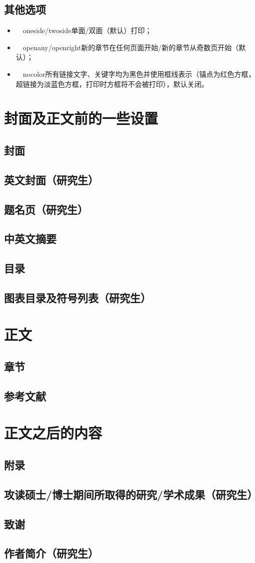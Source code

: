 		\subsection{其他选项}
		\begin{itemize}
			\item ~~oneside\slash twoside\quad 单面\slash 双面（默认）打印；\\
			\item ~~openany\slash openright\quad 新的章节在任何页面开始\slash 新的章节从奇数页开始（默认）；\\
			\item ~~nocolor\quad 所有链接文字、关键字均为黑色并使用框线表示（锚点为红色方框，超链接为淡蓝色方框，打印时方框将不会被打印），默认关闭。\\
		\end{itemize}
	\section{封面及正文前的一些设置}
		\subsection{封面}
		\subsection{英文封面（研究生）}
		\subsection{题名页（研究生）}
		\subsection{中英文摘要}
		\subsection{目录}
		\subsection{图表目录及符号列表（研究生）}
	\section{正文}
		\subsection{章节}
		\subsection{参考文献}
	\section{正文之后的内容}
		\subsection{附录}
		\subsection{攻读硕士\slash 博士期间所取得的研究\slash 学术成果（研究生）}
		\subsection{致谢}
		\subsection{作者简介（研究生）}
